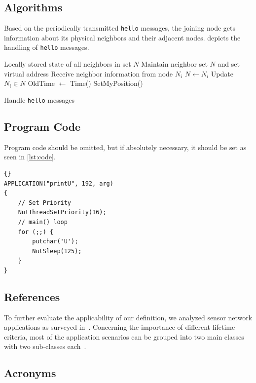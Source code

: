 \subsection{Algorithms}

Based on the periodically transmitted \texttt{hello} messages, the joining node gets information about its physical neighbors and their adjacent nodes.  depicts the handling of \texttt{hello} messages.

\begin{algorithm}
\begin{algorithmic}[1]
\REQUIRE Locally stored state of all neighbors in set $N$
\ENSURE Maintain neighbor set $N$ and set virtual address
\STATE Receive neighbor information from node $N_i$
	\STATE $N \gets N_i$
\ELSE
	\STATE Update $N_i \in N$
\ENDIF
{}
	\STATE OldTime $\gets$ Time()
	\STATE SetMyPosition()
\ENDIF
\end{algorithmic}
\caption{Handle \texttt{hello} messages}
\label{alg:H_hello}
\end{algorithm}

\subsection{Program Code}

Program code should be omitted, but if absolutely necessary, it should be set as seen in \cref{lst:code}.

\begin{lstlisting}[style=txt,caption=Sample application,label=lst:code]{}
APPLICATION("printU", 192, arg)
{
    // Set Priority
    NutThreadSetPriority(16);
    // main() loop
    for (;;) {
        putchar('U');
        NutSleep(125);
    }
}
\end{lstlisting}


\subsection{References}

To further evaluate the applicability of our definition, we analyzed sensor network applications as surveyed in~\cite{akyildiz2002survey,arampatzis2005survey,khemapach2005survey}. Concerning the importance of different lifetime criteria, most of the application scenarios can be grouped into two main classes with two sub-classes each~\cite{dietrich2009lifetime}.


\subsection{Acronyms}

